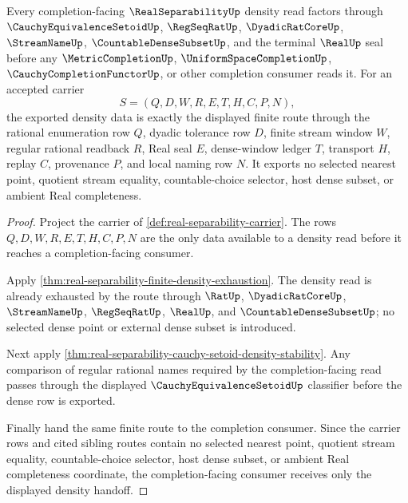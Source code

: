 \begin{theorem}
\label{thm:real-separability-completion-facing-density-handoff}
Every completion-facing $\RealSeparabilityUp$ density read factors through $\CauchyEquivalenceSetoidUp$, $\RegSeqRatUp$, $\DyadicRatCoreUp$, $\StreamNameUp$, $\CountableDenseSubsetUp$, and the terminal $\RealUp$ seal before any $\MetricCompletionUp$, $\UniformSpaceCompletionUp$, $\CauchyCompletionFunctorUp$, or other completion consumer reads it. For an accepted carrier
$$
S=(Q,D,W,R,E,T,H,C,P,N),
$$
the exported density data is exactly the displayed finite route through the rational enumeration row $Q$, dyadic tolerance row $D$, finite stream window $W$, regular rational readback $R$, Real seal $E$, dense-window ledger $T$, transport $H$, replay $C$, provenance $P$, and local naming row $N$. It exports no selected nearest point, quotient stream equality, countable-choice selector, host dense subset, or ambient Real completeness.
\end{theorem}
\begin{proof}
Project the carrier of \autoref{def:real-separability-carrier}. The rows $Q,D,W,R,E,T,H,C,P,N$ are the only data available to a density read before it reaches a completion-facing consumer.

Apply \autoref{thm:real-separability-finite-density-exhaustion}. The density read is already exhausted by the route through $\RatUp$, $\DyadicRatCoreUp$, $\StreamNameUp$, $\RegSeqRatUp$, $\RealUp$, and $\CountableDenseSubsetUp$; no selected dense point or external dense subset is introduced.

Next apply \autoref{thm:real-separability-cauchy-setoid-density-stability}. Any comparison of regular rational names required by the completion-facing read passes through the displayed $\CauchyEquivalenceSetoidUp$ classifier before the dense row is exported.

Finally hand the same finite route to the completion consumer. Since the carrier rows and cited sibling routes contain no selected nearest point, quotient stream equality, countable-choice selector, host dense subset, or ambient Real completeness coordinate, the completion-facing consumer receives only the displayed density handoff.
\end{proof}

